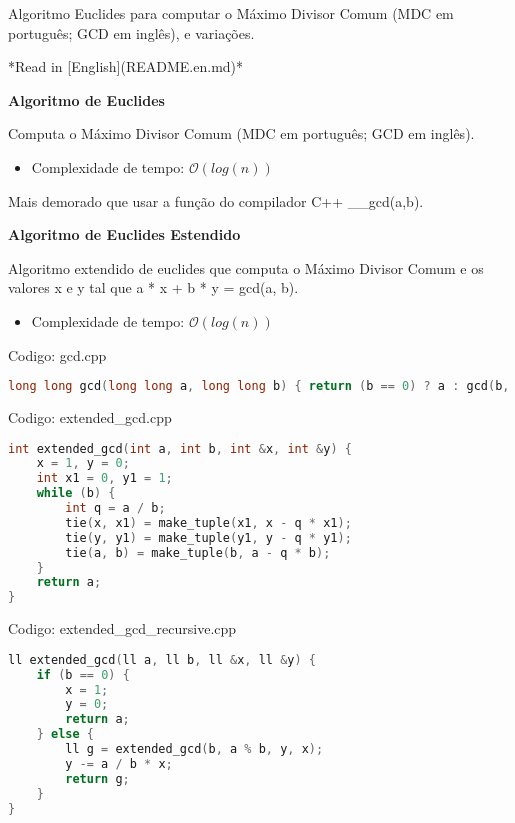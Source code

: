 \documentclass[10pt, a4paper, oneside]{book}
\begin{document}
Algoritmo Euclides para computar o Máximo Divisor Comum (MDC em português; GCD em inglês), e variações.



*Read in [English](README.en.md)*



\textbf{Algoritmo de Euclides} 



Computa o Máximo Divisor Comum (MDC em português; GCD em inglês).



\begin{itemize}
\item Complexidade de tempo: $\mathcal{O}(log(n))$
\end{itemize}



Mais demorado que usar a função do compilador C++ \_\_gcd(a,b).



\textbf{Algoritmo de Euclides Estendido} 



Algoritmo extendido de euclides que computa o Máximo Divisor Comum e os valores x e y tal que a * x + b * y = gcd(a, b).



\begin{itemize}
\item Complexidade de tempo: $\mathcal{O}(log(n))$
\end{itemize}

\hfill

Codigo: gcd.cpp

\begin{lstlisting}[language=C++]
long long gcd(long long a, long long b) { return (b == 0) ? a : gcd(b, a % b); }
\end{lstlisting}
\hfill

Codigo: extended\_gcd.cpp

\begin{lstlisting}[language=C++]
int extended_gcd(int a, int b, int &x, int &y) {
    x = 1, y = 0;
    int x1 = 0, y1 = 1;
    while (b) {
        int q = a / b;
        tie(x, x1) = make_tuple(x1, x - q * x1);
        tie(y, y1) = make_tuple(y1, y - q * y1);
        tie(a, b) = make_tuple(b, a - q * b);
    }
    return a;
}
\end{lstlisting}
\hfill

Codigo: extended\_gcd\_recursive.cpp

\begin{lstlisting}[language=C++]
ll extended_gcd(ll a, ll b, ll &x, ll &y) {
    if (b == 0) {
        x = 1;
        y = 0;
        return a;
    } else {
        ll g = extended_gcd(b, a % b, y, x);
        y -= a / b * x;
        return g;
    }
}
\end{lstlisting}
\hfill
\end{document}
